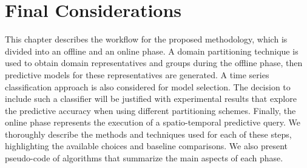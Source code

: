 \section{Final Considerations}
\label{Sec:MethodologySummary}

This chapter describes the workflow for the proposed methodology, which is divided into an offline and an online phase. A domain partitioning technique is used to obtain domain representatives and groups during the offline phase, then predictive models for these representatives are generated. A time series classification approach is also considered for model selection. The decision to include such a classifier will be justified with experimental results that explore the predictive accuracy when using different partitioning schemes. Finally, the online phase represents the execution of a spatio-temporal predictive query. We thoroughly describe the methods and techniques used for each of these steps, highlighting the available choices and baseline comparisons. We also present pseudo-code of algorithms that summarize the main aspects of each phase.
